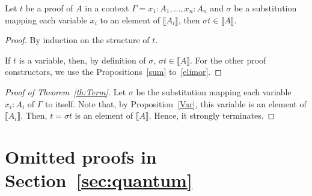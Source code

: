 \documentclass[screen, sigconf,authorversion,nonacm]{acmart}
\theoremstyle{acmdefinition}
\numberwithin{equation}{section}
\begin{document}
\begin{proposition}[Adequacy]
\label{prop:adequacy}
Let $t$ be a proof of $A$ in a context $\Gamma = x_1:A_1, \ldots, x_n:A_n$ and
$\sigma$ be a substitution mapping each variable $x_i$ to an element
of $\llbracket A_i \rrbracket$, then $\sigma t \in \llbracket A
\rrbracket$.
\end{proposition}

\begin{proof}
By induction on the structure of $t$.

If $t$ is a variable, then, by definition of $\sigma$, $\sigma t \in
\llbracket A \rrbracket$.  For the other proof constructors, we use
the Propositions~\ref{sum} to~\ref{elimor}.
\qedhere
\end{proof}

\begin{proof}[Proof of Theorem~\ref{th:Term}]
  Let $\sigma$ be the substitution mapping each variable $x_i:A_i$ of
  $\Gamma$ to
  itself. Note that, by Proposition~\ref{Var}, this variable is an
  element of $\llbracket A_i \rrbracket$.  Then, $t = \sigma t$ is an
  element of $\llbracket A \rrbracket$. Hence, it strongly terminates.
\qedhere
\end{proof}

\section{Omitted proofs in Section~\ref{sec:quantum}}
\end{document}
